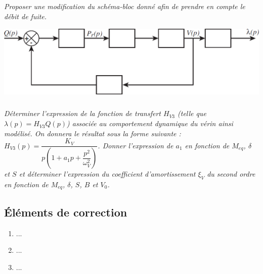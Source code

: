 \documentclass[10pt,fleqn]{article} %
\begin{document}
\begin{multicols}{2}
\subparagraph{}\textit{Proposer une modification du schéma-bloc donné afin de prendre en compte le débit de fuite.}
\ifprof
\begin{corrige}
\end{corrige}
\else
\fi
\begin{center}
\includegraphics[width=\linewidth]{images/fig_08}
\end{center}


\subparagraph{}\textit{Déterminer l'expression de la fonction de transfert $H_{V3}$ (telle que $\lambda(p) =  H_{V3} Q(p)$) associée au comportement dynamique du vérin ainsi modélisé. On donnera le résultat sous la forme suivante : 
$H_{V3}(p)=\dfrac{K_V}{p\left(1+a_1 p + \dfrac{p^2}{\omega_V^2} \right)}$.  
Donner l'expression de $a_1$ en fonction de $M_{eq}$, $\delta$ et $S$ et déterminer l'expression du coefficient d'amortissement $\xi_V$ du second ordre en fonction de $M_{eq}$, $\delta$, $S$, $B$ et $V_0$.}

\ifprof
\begin{corrige}
\end{corrige}
\else
\fi


\subsection*{Éléments de correction}
\begin{enumerate}
\item ...
\item ...
\item ...
\end{enumerate}
\end{multicols}

%
\end{document}
